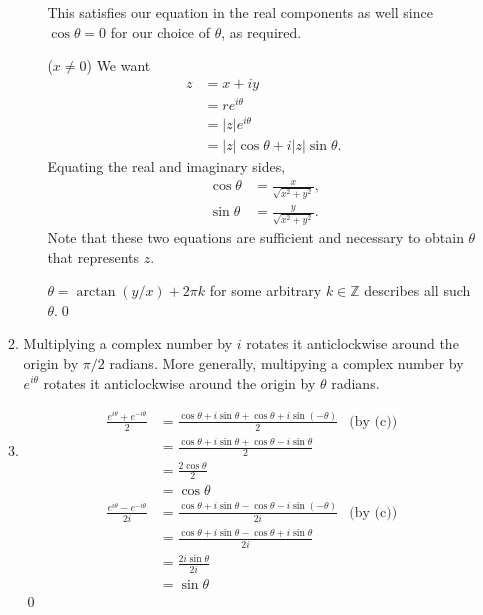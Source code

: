 \documentclass[oneside]{article}
\newcommand\abs[1]{\left|#1\right|}
\newcommand\bbZ{\mathbb{Z}}
\begin{document}
\begin{enumerate}[label=\textbf{\arabic*.}]
\begin{enumerate}[label=\textbf{(\alph*)}]
\begin{itemize}[leftmargin=64pt]
        This satisfies our equation in the real components as well since
        $\cos\theta = 0$ for our choice of $\theta$, as required.

        \item[($x \neq 0$)] We want \begin{align*}
          z &= x + iy \\
          &= re^{i\theta} \\
          &= \abs{z}e^{i\theta} \\
          &= \abs{z}\cos{\theta} + i\abs{z}\sin{\theta} \text{.}
        \end{align*}
        Equating the real and imaginary sides,\begin{align*}
          \cos\theta &= \frac{x}{\sqrt{x^2 + y^2}} \text{,} \\
          \sin\theta &= \frac{y}{\sqrt{x^2 + y^2}} \text{.}
        \end{align*} Note that these two equations are sufficient and necessary
        to obtain $\theta$ that represents $z$.

        $\theta = \arctan(y/x) + 2\pi k$ for some arbitrary $k \in \bbZ$
        describes all such $\theta$.\qed

      \end{itemize}

    \item Multiplying a complex number by $i$ rotates it anticlockwise around
    the origin by $\pi/2$ radians. More generally, multipying a complex number
    by $e^{i\theta}$ rotates it anticlockwise around the origin by $\theta$
    radians.

    \item \begin{align*}
      \frac{e^{i\theta}+e^{-i\theta}}{2}
      &= \frac{\cos\theta + i\sin\theta + \cos\theta + i\sin(-\theta)}{2}
      & \text{(by (c))}\\
      &= \frac{\cos\theta + i\sin\theta + \cos\theta - i\sin\theta}{2} \\
      &= \frac{2\cos\theta}{2} \\
      &= \cos\theta
    \end{align*}
    \begin{align*}
      \frac{e^{i\theta}-e^{-i\theta}}{2i}
      &= \frac{\cos\theta + i\sin\theta - \cos\theta - i\sin(-\theta)}{2i}
      & \text{(by (c))}\\
      &= \frac{\cos\theta + i\sin\theta - \cos\theta + i\sin\theta}{2i} \\
      &= \frac{2i\sin\theta}{2i} \\
      &= \sin\theta
    \end{align*}
    \qed


\end{enumerate}
\end{enumerate}
\end{document}
